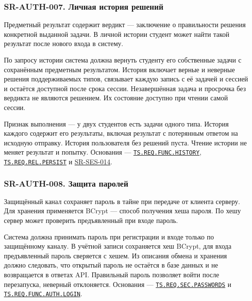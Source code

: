 \documentclass[12pt,a4paper]{article}
\begin{document}
\subsubsection{SR-AUTH-007. Личная история решений}\label{sr-auth-007-ux43bux438ux447ux43dux430ux44f-ux438ux441ux442ux43eux440ux438ux44f-ux440ux435ux448ux435ux43dux438ux439}

\hypertarget{sr-auth-007-личная-история-решений}{}

\hypertarget{sr-auth-007}{}

Предметный результат содержит вердикт --- заключение о правильности решения конкретной выданной задачи. В личной истории студент может найти такой результат после нового входа в систему.

По запросу истории система должна вернуть студенту его собственные задачи с сохранённым предметным результатом. История включает верные и неверные решения поддерживаемых типов, связывает каждую запись с её задачей и сессией и остаётся доступной после срока сессии. Незавершённая задача и просрочка без вердикта не являются решением. Их состояние доступно при чтении самой сессии.

Признак выполнения --- у двух студентов есть задачи одного типа. История каждого содержит его результаты, включая результат с потерянным ответом на исходную отправку. История пользователя без решений пуста. Чтение истории не меняет результат и попытку. Основания --- {\href{../02\_Техническое\_задание/DOC-02\_Техническое\_задание.pdf\#ts-req-func-history}{\texttt{TS.\allowbreak{}REQ.\allowbreak{}FUNC.\allowbreak{}HISTORY}}}, {\href{../02\_Техническое\_задание/DOC-02\_Техническое\_задание.pdf\#ts-req-rel-persist}{\texttt{TS.\allowbreak{}REQ.\allowbreak{}REL.\allowbreak{}PERSIST}}} и {\hyperlink{sr-ses-014}{SR-SES-014}}.

\subsubsection{SR-AUTH-008. Защита паролей}\label{sr-auth-008-ux437ux430ux449ux438ux442ux430-ux43fux430ux440ux43eux43bux435ux439}

\hypertarget{sr-auth-008-защита-паролей}{}

\hypertarget{sr-auth-008}{}

Защищённый канал сохраняет пароль в тайне при передаче от клиента серверу. Для хранения применяется BCrypt --- способ получения хеша пароля. По хешу сервер может проверить предъявленный при входе пароль.

Система должна принимать пароль при регистрации и входе только по защищённому каналу. В учётной записи сохраняется хеш BCrypt, для входа предъявленный пароль сверяется с хешем. Из описания обмена и хранения должно следовать, что открытый пароль не остаётся в базе данных и не возвращается в ответах API. Правильный пароль позволяет войти после перезапуска, неверный отклоняется. Основания --- {\href{../02\_Техническое\_задание/DOC-02\_Техническое\_задание.pdf\#ts-req-sec-passwords}{\texttt{TS.\allowbreak{}REQ.\allowbreak{}SEC.\allowbreak{}PASSWORDS}}} и {\href{../02\_Техническое\_задание/DOC-02\_Техническое\_задание.pdf\#ts-req-func-auth-login}{\texttt{TS.\allowbreak{}REQ.\allowbreak{}FUNC.\allowbreak{}AUTH.\allowbreak{}LOGIN}}}.
\end{document}
